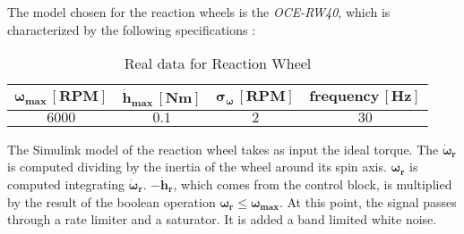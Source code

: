 The model chosen for the reaction wheels is the \textit{OCE-RW40}, which is characterized by the following specifications \cite{reactionwheel_site}:

\begin{table}[H]

    \centering
    \begin{tabular}{|c|c|c|c|}
    \hline
    $\bm{\omega_{max} \, [RPM]}$ & $\bm{\dot{h}_{max} \, [Nm]}$ & $\bm{\sigma_{\omega} \, [RPM]}$ & $\bm{frequency \, [Hz]}$\\
    \hline
    $6000$ & $0.1$ & $2$ & $30$ \\
    \hline
    \end{tabular}
    
    \caption{Real data for Reaction Wheel}
    \label{table:RW}
    
\end{table}

The Simulink model of the reaction wheel takes as input the ideal torque. The $\boldsymbol{\dot{\omega}_r}$ is computed dividing by the inertia of the wheel around its spin axis. $\boldsymbol{\omega_r}$ is computed integrating $\boldsymbol{\dot{\omega}_r}$. $-\boldsymbol{\dot{h}_r}$, which comes from the control block, is multiplied by the result of the boolean operation $\boldsymbol{\omega_r}\le\boldsymbol{\omega_{max}}$. At this point, the signal passes through a rate limiter and  a saturator. It is added a band limited white noise.